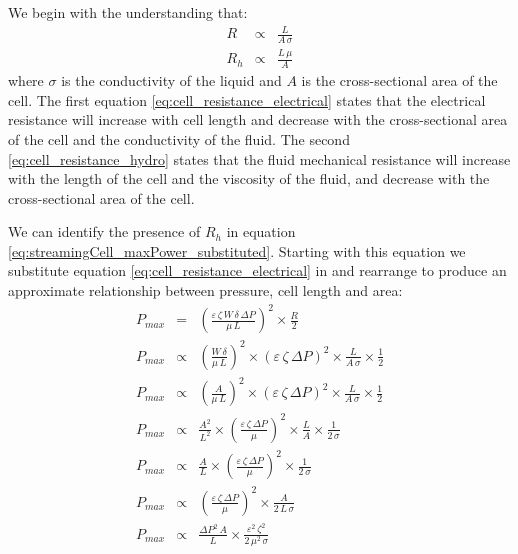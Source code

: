       We begin with the understanding that:
      \begin{eqnarray}
          R & \propto & \frac{L}{A\,\sigma}\label{eq:cell_resistance_electrical}\\
          R_{h} & \propto & \frac{L\,\mu}{A}\label{eq:cell_resistance_hydro}
      \end{eqnarray}
      where $\sigma$ is the conductivity of the liquid and $A$ is the cross-sectional area of the cell.
      The first equation \eqref{eq:cell_resistance_electrical} states that the electrical resistance will increase with cell length and decrease with the cross-sectional area of the cell and the conductivity of the fluid.
      The second \eqref{eq:cell_resistance_hydro} states that the fluid mechanical resistance will increase with the length of the cell and the viscosity of the fluid, and decrease with the cross-sectional area of the cell.

      We can identify the presence of $R_{h}$ in equation \eqref{eq:streamingCell_maxPower_substituted}.
      Starting with this equation we substitute equation \eqref{eq:cell_resistance_electrical} in and rearrange to produce an approximate relationship between pressure, cell length and area:
      \begin{eqnarray}
          P_{max} & = & \left(\frac{\varepsilon\,\zeta\,W\,\delta\,\Delta P}{\mu\,L}\right)^{2}\times\frac{R}{2}\nonumber\\
          P_{max} & \propto & \left(\frac{W\,\delta}{\mu\,L}\right)^{2}\times\left(\varepsilon\,\zeta\,\Delta P\right)^{2}\times \frac{L}{A\,\sigma} \times\frac{1}{2}\nonumber\\
          P_{max} & \propto & \left(\frac{A}{\mu\,L}\right)^{2}\times\left(\varepsilon\,\zeta\,\Delta P\right)^{2}\times \frac{L}{A\,\sigma} \times\frac{1}{2}\nonumber\\
          P_{max} & \propto & \frac{A^{2}}{L^{2}}\times\left(\frac{\varepsilon\,\zeta\,\Delta P}{\mu}\right)^{2}\times \frac{L}{A} \times\frac{1}{2\,\sigma}\nonumber\\
          P_{max} & \propto & \frac{A}{L}\times\left(\frac{\varepsilon\,\zeta\,\Delta P}{\mu}\right)^{2}\times\frac{1}{2\,\sigma}\nonumber\\
          P_{max} & \propto & \left(\frac{\varepsilon\,\zeta\,\Delta P}{\mu}\right)^{2}\times\frac{A}{2\,L\,\sigma}\nonumber\\
          P_{max} & \propto & \frac{\Delta P^{2}\,A}{L}\times \frac{\varepsilon^{2}\,\zeta^{2}}{2\,\mu^{2}\,\sigma}
          \label{eq:streamingCell_maxPower_relationship}
      \end{eqnarray}

